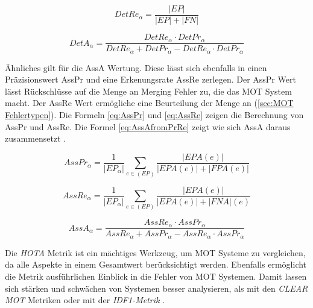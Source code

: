 \begin{equation}
    \label{eq:DetRe}
    DetRe_{\alpha} = \frac{|EP|}{|EP| + |FN|}
\end{equation}

\begin{equation}
    \label{eq:DetAfromPrRe}
    DetA_{\alpha} = \frac{ DetRe_{\alpha} \cdot DetPr_{\alpha} }{ DetRe_{\alpha} + DetPr_{\alpha} -  DetRe_{\alpha} \cdot DetPr_{\alpha}}
\end{equation}

Ähnliches gilt für die \gls{AssA} Wertung. Diese lässt sich ebenfalls in einen  Präzisionswert \gls{AssPr} und eine Erkenungsrate \gls{AssRe} zerlegen. Der \gls{AssPr} Wert lässt Rückschlüsse auf die Menge an \gls{Merging Fehler} zu, die das \gls{MOT} System macht. Der \gls{AssRe} Wert ermögliche eine Beurteilung der Menge an  (\autoref{sec:MOT Fehlertypen}). Die Formeln \ref{eq:AssPr} und \ref{eq:AssRe} zeigen die Berechnung von \gls{AssPr} und \gls{AssRe}. Die Formel \ref{eq:AssAfromPrRe} zeigt wie sich \gls{AssA} daraus zusammensetzt \cite{HOTA}. 

\begin{equation}
    \label{eq:AssPr}
    AssPr_{\alpha} =  \frac{1}{|EP_{\alpha}|} \sum_{e \in (EP)} \frac{|EPA(e)|}{|EPA(e)| + |FPA(e)|}
\end{equation}

\begin{equation}
    \label{eq:AssRe}
    AssRe_{\alpha} = \frac{1}{|EP_{\alpha}|} \sum_{e \in (EP)} \frac{|EPA(e)|}{|EPA(e)| + |FNA|(e)}
\end{equation}

\begin{equation}
    \label{eq:AssAfromPrRe}
    AssA_{\alpha} = \frac{AssRe_{\alpha} \cdot AssPr_{\alpha} }{AssRe_{\alpha} + AssPr_{\alpha} - AssRe_{\alpha} \cdot AssPr_{\alpha}}
\end{equation}

Die \textit{\gls{HOTA}} Metrik ist ein mächtiges Werkzeug, um \gls{MOT} Systeme zu vergleichen, da alle Aspekte in einem Gesamtwert berücksichtigt werden. Ebenfalls ermöglicht die Metrik ausführlichen Einblick in die Fehler von \gls{MOT} Systemen. Damit lassen sich stärken und schwächen von Systemen besser analysieren, als mit den \textit{\acrshort{CLEAR} \gls{MOT}} Metriken oder mit der \textit{\gls{IDF1}-Metrik} \cite{HOTA}. 